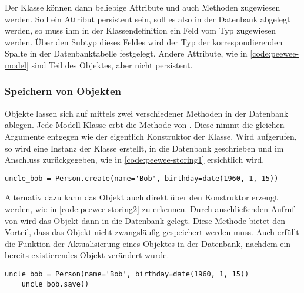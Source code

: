 Der Klasse können dann beliebige Attribute und auch Methoden zugewiesen werden. Soll ein Attribut persistent sein, soll es also in der Datenbank abgelegt werden, so muss ihm in der Klassendefinition ein Feld vom Typ  zugewiesen werden. Über den Subtyp dieses Feldes wird der Typ der korrespondierenden Spalte in der Datenbanktabelle festgelegt. Andere Attribute, wie  in \autoref{code:peewee-model} sind Teil des Objektes, aber nicht persistent.

\subsubsection*{Speichern von Objekten}

Objekte lassen sich auf mittels zwei verschiedener Methoden in der Datenbank ablegen. Jede Modell-Klasse erbt die Methode  von . Diese nimmt die gleichen Argumente entgegen wie der eigentlich Konstruktor der Klasse. Wird  aufgerufen, so wird eine Instanz der Klasse erstellt, in die Datenbank geschrieben und im Anschluss zurückgegeben, wie in \autoref{code:peewee-storing1} ersichtlich wird.

\lstset{language=python}
\begin{lstlisting}[caption={Python-Code zum Erzeugen eines Personen-Objektes und zur Speicherung in der Datenbank in einem Schritt.  \cite{noauthor_quickstart_2023}}, label=code:peewee-storing1]
    uncle_bob = Person.create(name='Bob', birthday=date(1960, 1, 15))
\end{lstlisting}

Alternativ dazu kann das Objekt auch direkt über den Konstruktor erzeugt werden, wie in \autoref{code:peewee-storing2} zu erkennen. Durch anschließenden Aufruf von  wird das Objekt dann in die Datenbank gelegt. Diese Methode bietet den Vorteil, dass das Objekt nicht zwangsläufig gespeichert werden muss. Auch erfüllt  die Funktion der Aktualisierung eines Objektes in der Datenbank, nachdem ein bereits existierendes Objekt verändert wurde.

\lstset{language=python}
\begin{lstlisting}[caption={Python-Code zum Erzeugen eines Personen-Objektes und zur anschließenden Speicherung in der Datenbank.  \cite{noauthor_quickstart_2023}}, label=code:peewee-storing2]
    uncle_bob = Person(name='Bob', birthday=date(1960, 1, 15))
    uncle_bob.save()
\end{lstlisting}

